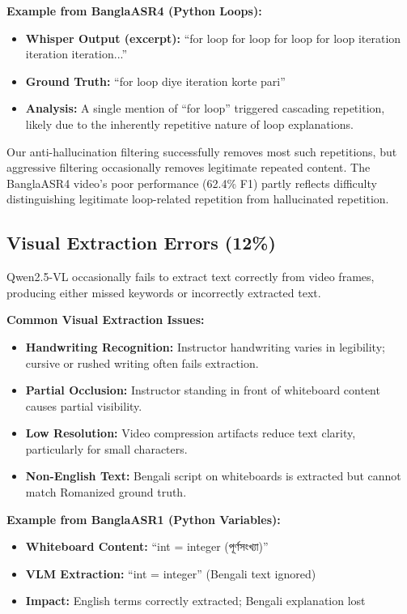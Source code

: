 \textbf{Example from BanglaASR4 (Python Loops):}

\begin{itemize}
    \item \textbf{Whisper Output (excerpt):} ``for loop for loop for loop for loop iteration iteration iteration...''
    \item \textbf{Ground Truth:} ``for loop diye iteration korte pari''
    \item \textbf{Analysis:} A single mention of ``for loop'' triggered cascading repetition, likely due to the inherently repetitive nature of loop explanations.
\end{itemize}

Our anti-hallucination filtering successfully removes most such repetitions, but aggressive filtering occasionally removes legitimate repeated content. The BanglaASR4 video's poor performance (62.4\% F1) partly reflects difficulty distinguishing legitimate loop-related repetition from hallucinated repetition.

\subsection{Visual Extraction Errors (12\%)}

Qwen2.5-VL occasionally fails to extract text correctly from video frames, producing either missed keywords or incorrectly extracted text.

\textbf{Common Visual Extraction Issues:}

\begin{itemize}
    \item \textbf{Handwriting Recognition:} Instructor handwriting varies in legibility; cursive or rushed writing often fails extraction.
    \item \textbf{Partial Occlusion:} Instructor standing in front of whiteboard content causes partial visibility.
    \item \textbf{Low Resolution:} Video compression artifacts reduce text clarity, particularly for small characters.
    \item \textbf{Non-English Text:} Bengali script on whiteboards is extracted but cannot match Romanized ground truth.
\end{itemize}

\textbf{Example from BanglaASR1 (Python Variables):}

\begin{itemize}
    \item \textbf{Whiteboard Content:} ``int = integer (পূর্ণসংখ্যা)''
    \item \textbf{VLM Extraction:} ``int = integer'' (Bengali text ignored)
    \item \textbf{Impact:} English terms correctly extracted; Bengali explanation lost
\end{itemize}

